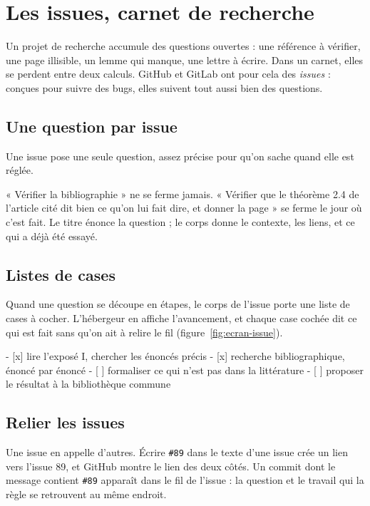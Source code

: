 \chapter{Les issues, carnet de recherche}

Un projet de recherche accumule des questions ouvertes : une référence à vérifier, une page
illisible, un lemme qui manque, une lettre à écrire. Dans un carnet, elles se
perdent entre deux calculs. GitHub et GitLab ont pour cela des
\emph{issues} : conçues pour suivre des bugs, elles suivent tout aussi bien des
questions.

\section{Une question par issue}

\begin{regle}
Une issue pose une seule question, assez précise pour qu'on sache quand elle est réglée.
\end{regle}

« Vérifier la bibliographie » ne se ferme jamais. « Vérifier que le théorème 2.4 de
l'article cité dit bien ce qu'on lui fait dire, et donner la page » se ferme le jour où
c'est fait. Le titre énonce la question ; le corps donne le contexte, les liens, et ce qui
a déjà été essayé.

\section{Listes de cases}

Quand une question se découpe en étapes, le corps de l'issue porte une liste de cases à
cocher. L'hébergeur en affiche l'avancement, et chaque case cochée dit ce qui est fait sans
qu'on ait à relire le fil (figure~\ref{fig:ecran-issue}).



\begin{terminal}
- [x] lire l'exposé I, chercher les énoncés précis
- [x] recherche bibliographique, énoncé par énoncé
- [ ] formaliser ce qui n'est pas dans la littérature
- [ ] proposer le résultat à la bibliothèque commune
\end{terminal}

\section{Relier les issues}

Une issue en appelle d'autres. Écrire \texttt{\#89} dans le texte d'une issue crée un lien
vers l'issue 89, et GitHub montre le lien des deux côtés. Un commit dont le message
contient \texttt{\#89} apparaît dans le fil de l'issue : la question et le travail qui la
règle se retrouvent au même endroit.

